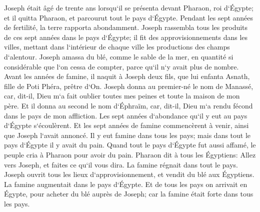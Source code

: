 \verse Joseph était âgé de trente ans lorsqu`il se présenta devant Pharaon, roi d`Égypte; et il quitta Pharaon, et parcourut tout le pays d`Égypte. 
\verse Pendant les sept années de fertilité, la terre rapporta abondamment. 
\verse Joseph rassembla tous les produits de ces sept années dans le pays d`Égypte; il fit des approvisionnements dans les villes, mettant dans l`intérieur de chaque ville les productions des champs d`alentour. 
\verse Joseph amassa du blé, comme le sable de la mer, en quantité si considérable que l`on cessa de compter, parce qu`il n`y avait plus de nombre. 
\verse Avant les années de famine, il naquit à Joseph deux fils, que lui enfanta Asnath, fille de Poti Phéra, prêtre d`On. 
\verse Joseph donna au premier-né le nom de Manassé, car, dit-il, Dieu m`a fait oublier toutes mes peines et toute la maison de mon père. 
\verse Et il donna au second le nom d`Éphraïm, car, dit-il, Dieu m`a rendu fécond dans le pays de mon affliction. 
\verse Les sept années d`abondance qu`il y eut au pays d`Égypte s`écoulèrent. 
\verse Et les sept années de famine commencèrent à venir, ainsi que Joseph l`avait annoncé. Il y eut famine dans tous les pays; mais dans tout le pays d`Égypte il y avait du pain. 
\verse Quand tout le pays d`Égypte fut aussi affamé, le peuple cria à Pharaon pour avoir du pain. Pharaon dit à tous les Égyptiens: Allez vers Joseph, et faites ce qu`il vous dira. 
\verse La famine régnait dans tout le pays. Joseph ouvrit tous les lieux d`approvisionnement, et vendit du blé aux Égyptiens. La famine augmentait dans le pays d`Égypte. 
\verse Et de tous les pays on arrivait en Égypte, pour acheter du blé auprès de Joseph; car la famine était forte dans tous les pays. 

